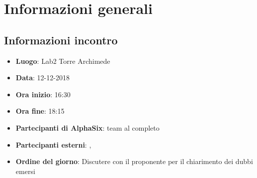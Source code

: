 \newcommand{\documento}{\VE}
\newcommand{\nomedocumentofisico}{VE\_12\_12\_2018.pdf}
\newcommand{\redazione}{\NC}
\newcommand{\verifica}{\MM}
\newcommand{\approvazione}{\SG}
\newcommand{\versione}{1.0.0}
\newcommand{\uso}{Esterno}
\newcommand{\destinateTo}{\TV, \\ & \RC, \\ & \II}
\newcommand{\datacreazione}{15 dicembre 2018}
\newcommand{\datamodifica}{17 dicembre 2018}
\newcommand{\stato}{Approvato}

\def\TABELLE{false}	%
\def\FIGURE{false} 	%






    

    
    
	
    
    \section{Informazioni generali}
		\subsection{Informazioni incontro}
			\begin{itemize}
				\item { \textbf{Luogo}:  Lab2 Torre Archimede}
				\item { \textbf{Data}: 12-12-2018}
				\item { \textbf{Ora inizio}: 16:30}
				\item { \textbf{Ora fine}: 18:15}
				\item { \textbf{Partecipanti di AlphaSix}: team al completo}
				\item { \textbf{Partecipanti esterni}: {\LuC}, {\DZ}}
				\item { \textbf{Ordine del giorno}: Discutere con il proponente per il chiarimento dei dubbi emersi}
			\end{itemize}

